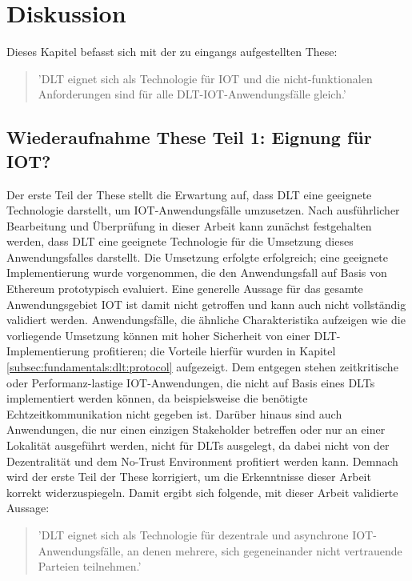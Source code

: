 \chapter{Diskussion}
\label{ch:discussion}
Dieses Kapitel befasst sich mit der zu eingangs aufgestellten These:
\begin{quote}
  '\ac{DLT} eignet sich als Technologie für \ac{IOT} und die nicht-funktionalen Anforderungen sind für alle \ac{DLT}-\ac{IOT}-Anwendungsfälle gleich.'
\end{quote}


\section{Wiederaufnahme These Teil 1: Eignung für IOT?}
\label{sec:discussion:part1}
Der erste Teil der These stellt die Erwartung auf, dass \ac{DLT} eine geeignete Technologie darstellt, um \ac{IOT}-Anwendungsfälle umzusetzen. Nach ausführlicher Bearbeitung und Überprüfung in dieser Arbeit kann zunächst festgehalten werden, dass \ac{DLT} eine geeignete Technologie für die Umsetzung dieses Anwendungsfalles darstellt. Die Umsetzung erfolgte erfolgreich; eine geeignete Implementierung wurde vorgenommen, die den Anwendungsfall auf Basis von Ethereum prototypisch evaluiert. Eine generelle Aussage für das gesamte Anwendungsgebiet \ac{IOT} ist damit nicht getroffen und kann auch nicht vollständig validiert werden. Anwendungsfälle, die ähnliche Charakteristika aufzeigen wie die vorliegende Umsetzung können mit hoher Sicherheit von einer \ac{DLT}-Implementierung profitieren; die Vorteile hierfür wurden in Kapitel \ref{subsec:fundamentals:dlt:protocol} aufgezeigt. Dem entgegen stehen zeitkritische oder Performanz-lastige \ac{IOT}-Anwendungen, die nicht auf Basis eines \ac{DLT}s implementiert werden können, da beispielsweise die benötigte Echtzeitkommunikation nicht gegeben ist. Darüber hinaus sind auch Anwendungen, die nur einen einzigen Stakeholder betreffen oder nur an einer Lokalität ausgeführt werden, nicht für \ac{DLT}s ausgelegt, da dabei nicht von der Dezentralität und dem No-Trust Environment profitiert werden kann. Demnach wird der erste Teil der These korrigiert, um die Erkenntnisse dieser Arbeit korrekt widerzuspiegeln. Damit ergibt sich folgende, mit dieser Arbeit validierte Aussage:
\begin{quote}
  '\ac{DLT} eignet sich als Technologie für dezentrale und asynchrone \ac{IOT}-Anwendungsfälle, an denen mehrere, sich gegeneinander nicht vertrauende Parteien teilnehmen.'
\end{quote}

